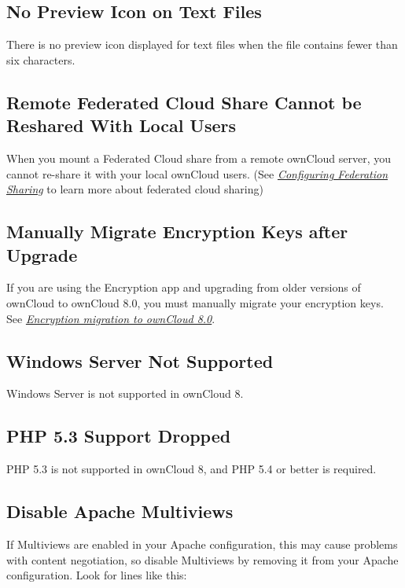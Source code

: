 \documentclass[letterpaper,10pt,english]{sphinxmanual}
\begin{document}
\subsection{No Preview Icon on Text Files}
\label{release_notes:no-preview-icon-on-text-files}
There is no preview icon displayed for text files when the file contains fewer than six characters.


\subsection{Remote Federated Cloud Share Cannot be Reshared With Local Users}
\label{release_notes:remote-federated-cloud-share-cannot-be-reshared-with-local-users}
When you mount a Federated Cloud share from a remote ownCloud server, you cannot re-share it with
your local ownCloud users. (See {\hyperref[configuration_files/federated_cloud_sharing_configuration::doc]{\emph{\emph{Configuring Federation Sharing}}}}
to learn more about federated cloud sharing)


\subsection{Manually Migrate Encryption Keys after Upgrade}
\label{release_notes:manually-migrate-encryption-keys-after-upgrade}
If you are using the Encryption app and upgrading from older versions of
ownCloud to ownCloud 8.0, you must manually migrate your encryption keys.
See {\hyperref[configuration_files/encryption_configuration:upgrading\string-encryption\string-label]{\emph{Encryption migration to ownCloud 8.0}}}.


\subsection{Windows Server Not Supported}
\label{release_notes:windows-server-not-supported}
Windows Server is not supported in ownCloud 8.


\subsection{PHP 5.3 Support Dropped}
\label{release_notes:php-5-3-support-dropped}
PHP 5.3 is not supported in ownCloud 8, and PHP 5.4 or better is required.


\subsection{Disable Apache Multiviews}
\label{release_notes:disable-apache-multiviews}
If Multiviews are enabled in your Apache configuration, this may cause problems
with content negotiation, so disable Multiviews by removing it from your Apache
configuration. Look for lines like this:
\end{document}
